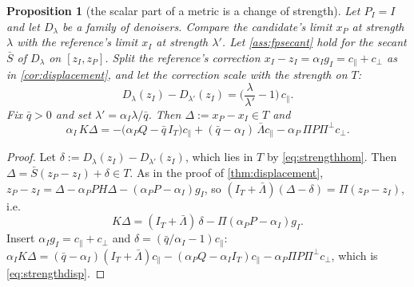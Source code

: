 \documentclass[11pt]{article}
\newtheorem{proposition}[theorem]{Proposition}
\theoremstyle{definition}
\theoremstyle{remark}
\begin{document}
\begin{proposition}[the scalar part of a metric is a change of strength]\label{prop:strength}
Let $P_I=I$ and let $D_\lambda$ be a family of denoisers. Compare the candidate's limit $x_P$ at strength $\lambda$
with the reference's limit $x_I$ at strength $\lambda'$. Let \cref{ass:fpsecant} hold for the secant $\bar S$ of
$D_\lambda$ on $[z_I,z_P]$. Split the reference's correction $x_I-z_I=\alpha_Ig_I=c_\parallel+c_\perp$ as in
\cref{cor:displacement}, and let the correction scale with the strength on $T$:
\begin{equation}\label{eq:strengthhom}
  D_\lambda(z_I)-D_{\lambda'}(z_I)=\Big(\frac{\lambda}{\lambda'}-1\Big)\,c_\parallel .
\end{equation}
Fix $\bar q>0$ and set $\lambda'=\alpha_I\lambda/\bar q$. Then $\Delta:=x_P-x_I\in T$ and
\begin{equation}\label{eq:strengthdisp}
  \alpha_I\,K\Delta=-\big(\alpha_PQ-\bar q\,I_T\big)c_\parallel+(\bar q-\alpha_I)\,\bar\Lambda c_\parallel-\alpha_P\,\Pi P\Pi^\perp c_\perp .
\end{equation}
\end{proposition}
\begin{proof}
Let $\delta:=D_\lambda(z_I)-D_{\lambda'}(z_I)$, which lies in $T$ by \eqref{eq:strengthhom}. Then
$\Delta=\bar S(z_P-z_I)+\delta\in T$. As in the proof of \cref{thm:displacement},
$z_P-z_I=\Delta-\alpha_PPH\Delta-(\alpha_PP-\alpha_I)g_I$, so $(I_T+\bar\Lambda)(\Delta-\delta)=\Pi(z_P-z_I)$, i.e.
\[
K\Delta=(I_T+\bar\Lambda)\,\delta-\Pi(\alpha_PP-\alpha_I)g_I .
\]
Insert $\alpha_Ig_I=c_\parallel+c_\perp$ and $\delta=(\bar q/\alpha_I-1)c_\parallel$:
$\alpha_IK\Delta=(\bar q-\alpha_I)(I_T+\bar\Lambda)c_\parallel-(\alpha_PQ-\alpha_II_T)c_\parallel-\alpha_P\Pi P\Pi^\perp c_\perp$,
which is \eqref{eq:strengthdisp}.
\end{proof}
\end{document}
